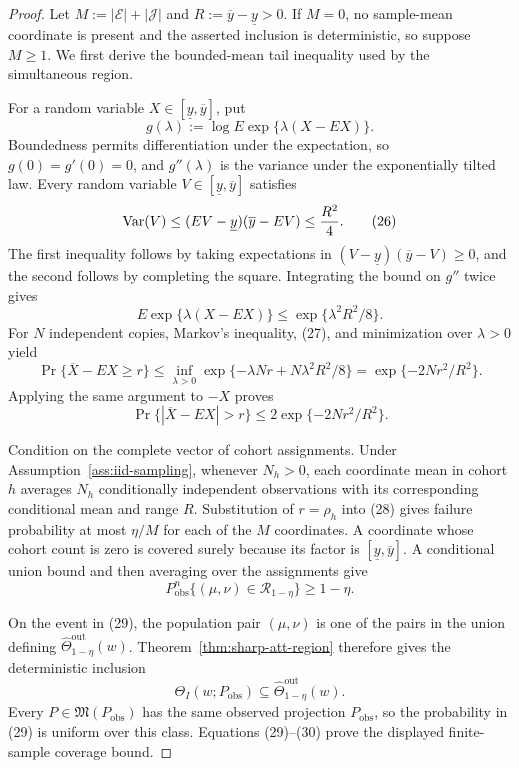 \documentclass{article}
\begin{document}
\begin{proof}
Let \(M:=|\mathcal E|+|\mathcal J|\) and \(R:=\overline y-\underline y>0\).  If \(M=0\), no sample-mean coordinate is present and the asserted inclusion is deterministic, so suppose \(M\ge1\).  We first derive the bounded-mean tail inequality used by the simultaneous region.

For a random variable \(X\in[\underline y,\overline y]\), put
\[
 g(\lambda):=\log E\exp\{\lambda(X-EX)\}.
\]
Boundedness permits differentiation under the expectation, so \(g(0)=g'(0)=0\), and \(g''(\lambda)\) is the variance under the exponentially tilted law.  Every random variable \(V\in[\underline y,\overline y]\) satisfies
\[
 \operatorname{Var}(V)
 \le(EV-\underline y)(\overline y-EV)
 \le {R^2\over4}.
\tag{26}
\]
The first inequality follows by taking expectations in \((V-\underline y)(\overline y-V)\ge0\), and the second follows by completing the square.  Integrating the bound on \(g''\) twice gives
\[
 E\exp\{\lambda(X-EX)\}\le\exp\{\lambda^2R^2/8\}.
\tag{27}
\]
For \(N\) independent copies, Markov's inequality, (27), and minimization over \(\lambda>0\) yield
\[
 \Pr\{\overline X-EX\ge r\}
 \le\inf_{\lambda>0}
 \exp\{-\lambda Nr+N\lambda^2R^2/8\}
 =\exp\{-2Nr^2/R^2\}.
\]
Applying the same argument to \(-X\) proves
\[
 \Pr\{|\overline X-EX|>r\}
 \le2\exp\{-2Nr^2/R^2\}.
\tag{28}
\]

Condition on the complete vector of cohort assignments.  Under Assumption~\ref{ass:iid-sampling}, whenever \(N_h>0\), each coordinate mean in cohort \(h\) averages \(N_h\) conditionally independent observations with its corresponding conditional mean and range \(R\).  Substitution of \(r=\rho_h\) into (28) gives failure probability at most \(\eta/M\) for each of the \(M\) coordinates.  A coordinate whose cohort count is zero is covered surely because its factor is \([\underline y,\overline y]\).  A conditional union bound and then averaging over the assignments give
\[
 P_{\mathrm{obs}}^n\{(\mu,\nu)\in\mathcal R_{1-\eta}\}
 \ge1-\eta.
\tag{29}
\]

On the event in (29), the population pair \((\mu,\nu)\) is one of the pairs in the union defining \(\widehat\Theta^{\mathrm{out}}_{1-\eta}(w)\).  Theorem~\ref{thm:sharp-att-region} therefore gives the deterministic inclusion
\[
 \Theta_I(w;P_{\mathrm{obs}})
 \subseteq\widehat\Theta^{\mathrm{out}}_{1-\eta}(w).
\tag{30}
\]
Every \(P\in\mathfrak M(P_{\mathrm{obs}})\) has the same observed projection \(P_{\mathrm{obs}}\), so the probability in (29) is uniform over this class.  Equations (29)--(30) prove the displayed finite-sample coverage bound.


\end{proof}
\end{document}
